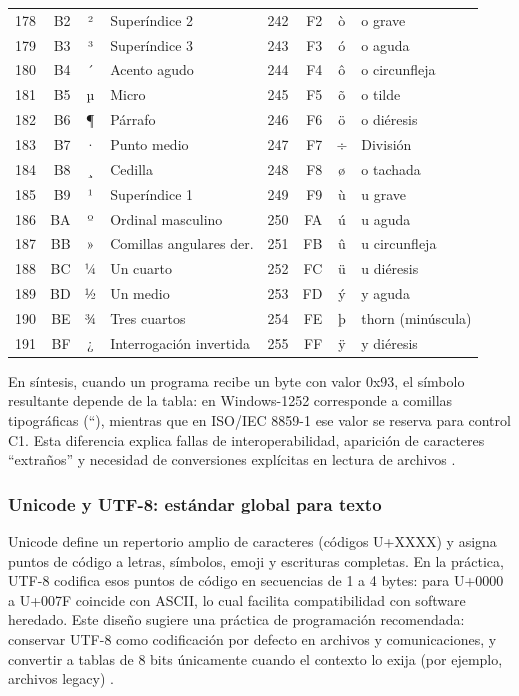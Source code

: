\documentclass[12pt,twoside]{book}
\begin{document}
\begin{longtable}{r r c l r r c l}
						178 & B2 & ² & Superíndice 2 & 242 & F2 & ò & o grave \\
						179 & B3 & ³ & Superíndice 3 & 243 & F3 & ó & o aguda \\
						180 & B4 & ´ & Acento agudo & 244 & F4 & ô & o circunfleja \\
						181 & B5 & µ & Micro & 245 & F5 & õ & o tilde \\
						182 & B6 & ¶ & Párrafo & 246 & F6 & ö & o diéresis \\
						183 & B7 & · & Punto medio & 247 & F7 & ÷ & División \\
						184 & B8 & ¸ & Cedilla & 248 & F8 & ø & o tachada \\
						185 & B9 & ¹ & Superíndice 1 & 249 & F9 & ù & u grave \\
						186 & BA & º & Ordinal masculino & 250 & FA & ú & u aguda \\
						187 & BB & » & Comillas angulares der. & 251 & FB & û & u circunfleja \\
						188 & BC & ¼ & Un cuarto & 252 & FC & ü & u diéresis \\
						189 & BD & ½ & Un medio & 253 & FD & ý & y aguda \\
						190 & BE & ¾ & Tres cuartos & 254 & FE & þ & thorn (minúscula) \\
						191 & BF & ¿ & Interrogación invertida & 255 & FF & ÿ & y diéresis \\
					\end{longtable}
										
					\noindent
					En síntesis, cuando un programa recibe un byte con valor 0x93, el símbolo resultante depende de la tabla: en Windows-1252 corresponde a comillas tipográficas (\textquotedblleft), mientras que en ISO/IEC 8859-1 ese valor se reserva para control C1. Esta diferencia explica fallas de interoperabilidad, aparición de caracteres ``extraños'' y necesidad de conversiones explícitas en lectura de archivos \cite{Microsoft2021CodePage,Unicode2025Standard}.
					
				\subsubsection*{Unicode y UTF-8: estándar global para texto}
					\noindent
					Unicode define un repertorio amplio de caracteres (códigos U+XXXX) y asigna puntos de código a letras, símbolos, emoji y escrituras completas. En la práctica, UTF-8 codifica esos puntos de código en secuencias de 1 a 4 bytes: para U+0000 a U+007F coincide con ASCII, lo cual facilita compatibilidad con software heredado. Este diseño sugiere una práctica de programación recomendada: conservar UTF-8 como codificación por defecto en archivos y comunicaciones, y convertir a tablas de 8 bits únicamente cuando el contexto lo exija (por ejemplo, archivos legacy) \cite{Unicode2025Standard,Yergeau2003UTF8}.
					
\end{document}
